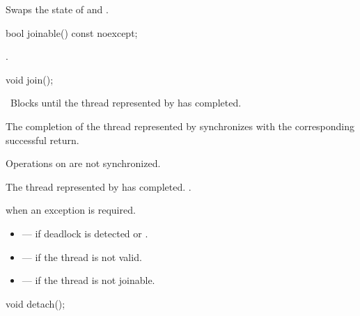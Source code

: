 \begin{itemdescr}
\pnum
\effects Swaps the state of  and .
\end{itemdescr}

%
\begin{itemdecl}
bool joinable() const noexcept;
\end{itemdecl}

\begin{itemdescr}
\pnum
\returns {}.
\end{itemdescr}

%
\begin{itemdecl}
void join();
\end{itemdecl}

\begin{itemdescr}
\pnum
\effects\ Blocks until the thread represented by  has completed.

\pnum
\sync The completion of the thread represented by  synchronizes with
the corresponding successful
 return. \begin{note} Operations on
 are not synchronized. \end{note}

\pnum
\postconditions The thread represented by  has completed. .

\pnum
\throws {} when
an exception is required.

\pnum
\errors
\begin{itemize}
\item {} --- if deadlock is detected or
.

\item {} --- if the thread is not valid.

\item {} --- if the thread is not joinable.
\end{itemize}
\end{itemdescr}

%
\begin{itemdecl}
void detach();
\end{itemdecl}

